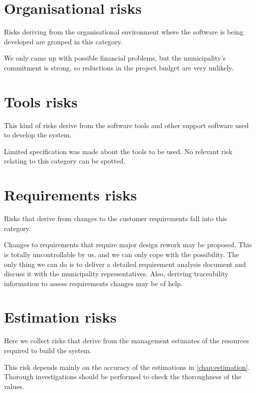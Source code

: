 \section{Organisational risks}

Risks deriving from the organisational environment where the software is being developed are grouped in this category.

We only came up with possible financial problems, but the municipality's commitment is strong, so reductions in the project budget are very unlikely.





\section{Tools risks}

This kind of risks derive from the software tools and other support software used to develop the system.

Limited specification was made about the tools to be used. No relevant risk relating to this category can be spotted.




\section{Requirements risks}

Risks that derive from changes to the customer requirements fall into this category.

Changes to requirements that require major design rework may be proposed. This is totally uncontrollable by us, and we can only cope with the possibility. The only thing we can do is to deliver a detailed requirement analysis document and discuss it with the municipality representatives. Also, deriving traceability information to assess requirements changes may be of help.




\section{Estimation risks}

Here we collect risks that derive from the management estimates of the resources required to build the system.

This risk depends mainly on the accuracy of the estimations in \cref{chap:estimation}. Thorough investigations should be performed to check the thoroughness of the values.







	
